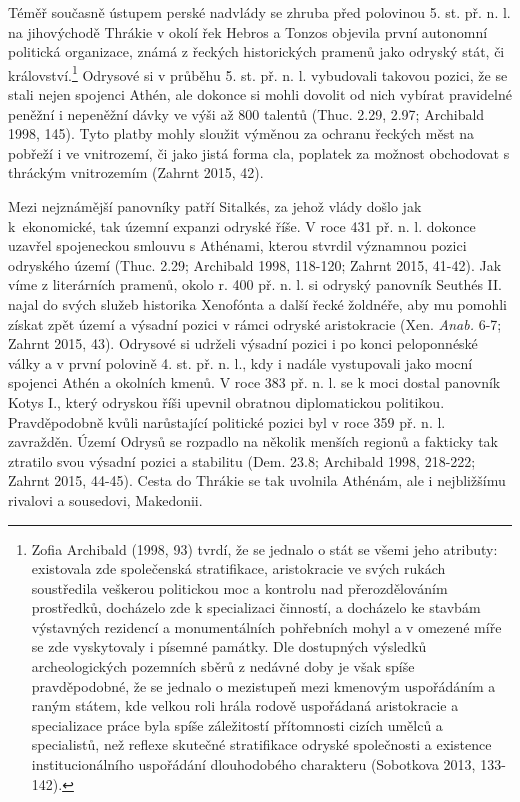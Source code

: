 Téměř současně ústupem perské nadvlády se zhruba před polovinou 5. st. př. n. l. na jihovýchodě Thrákie v okolí řek Hebros a Tonzos objevila první autonomní politická organizace, známá z řeckých historických pramenů jako odryský stát, či království.\footnote{Zofia Archibald (1998, 93) tvrdí, že se jednalo o stát se všemi jeho atributy: existovala zde společenská stratifikace, aristokracie ve svých rukách soustředila veškerou politickou moc a kontrolu nad přerozdělováním prostředků, docházelo zde k specializaci činností, a docházelo ke stavbám výstavných rezidencí a monumentálních pohřebních mohyl a v omezené míře se zde vyskytovaly i písemné památky. Dle dostupných výsledků archeologických pozemních sběrů z nedávné doby je však spíše pravděpodobné, že se jednalo o mezistupeň mezi kmenovým uspořádáním a raným státem, kde velkou roli hrála rodově uspořádaná aristokracie a specializace práce byla spíše záležitostí přítomnosti cizích umělců a specialistů, než reflexe skutečné stratifikace odryské společnosti a existence institucionálního uspořádání dlouhodobého charakteru (Sobotkova 2013, 133-142).} Odrysové si v průběhu 5. st. př. n. l. vybudovali takovou pozici, že se stali nejen spojenci Athén, ale dokonce si mohli dovolit od nich vybírat pravidelné peněžní i nepeněžní dávky ve výši až 800 talentů (Thuc. 2.29, 2.97; Archibald 1998, 145). Tyto platby mohly sloužit výměnou za ochranu řeckých měst na pobřeží i ve vnitrozemí, či jako jistá forma cla, poplatek za možnost obchodovat s thráckým vnitrozemím (Zahrnt 2015, 42).

Mezi nejznámější panovníky patří Sitalkés, za jehož vlády došlo jak k~ekonomické, tak územní expanzi odryské říše. V roce 431 př. n. l. dokonce uzavřel spojeneckou smlouvu s Athénami, kterou stvrdil významnou pozici odryského území (Thuc. 2.29; Archibald 1998, 118-120; Zahrnt 2015, 41-42). Jak víme z literárních pramenů, okolo r. 400 př. n. l. si odryský panovník Seuthés II. najal do svých služeb historika Xenofónta a další řecké žoldnéře, aby mu pomohli získat zpět území a výsadní pozici v rámci odryské aristokracie (Xen. {\em Anab.} 6-7; Zahrnt 2015, 43). Odrysové si udrželi výsadní pozici i po konci peloponnéské války a v první polovině 4. st. př. n. l., kdy i nadále vystupovali jako mocní spojenci Athén a okolních kmenů. V roce 383 př. n. l. se k moci dostal panovník Kotys I., který odryskou říši upevnil obratnou diplomatickou politikou. Pravděpodobně kvůli narůstající politické pozici byl v roce 359 př. n. l. zavražděn. Území Odrysů se rozpadlo na několik menších regionů a fakticky tak ztratilo svou výsadní pozici a stabilitu (Dem. 23.8; Archibald 1998, 218-222; Zahrnt 2015, 44-45). Cesta do Thrákie se tak uvolnila Athénám, ale i nejbližšímu rivalovi a sousedovi, Makedonii.

